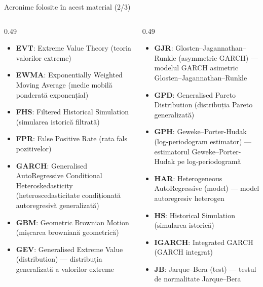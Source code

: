 \begin{frame}{Acronime folosite în acest material (2/3)}
\begin{columns}[T]
\begin{column}{0.49\textwidth}
\begin{itemize}\setlength{\itemsep}{0pt}
    \item \textbf{EVT}: Extreme Value Theory (teoria valorilor extreme)
    \item \textbf{EWMA}: Exponentially Weighted Moving Average (medie mobilă ponderată exponențial)
    \item \textbf{FHS}: Filtered Historical Simulation (simularea istorică filtrată)
    \item \textbf{FPR}: False Positive Rate (rata fals pozitivelor)
    \item \textbf{GARCH}: Generalised AutoRegressive Conditional Heteroskedasticity (heteroscedasticitate condiționată autoregresivă generalizată)
    \item \textbf{GBM}: Geometric Brownian Motion (mișcarea browniană geometrică)
    \item \textbf{GEV}: Generalised Extreme Value (distribution) — distribuția generalizată a valorilor extreme
\end{itemize}
\end{column}
\begin{column}{0.49\textwidth}
\begin{itemize}\setlength{\itemsep}{0pt}
    \item \textbf{GJR}: Glosten–Jagannathan–Runkle (asymmetric GARCH) — modelul GARCH asimetric Glosten–Jagannathan–Runkle
    \item \textbf{GPD}: Generalised Pareto Distribution (distribuția Pareto generalizată)
    \item \textbf{GPH}: Geweke–Porter-Hudak (log-periodogram estimator) — estimatorul Geweke–Porter-Hudak pe log-periodogramă
    \item \textbf{HAR}: Heterogeneous AutoRegressive (model) — model autoregresiv heterogen
    \item \textbf{HS}: Historical Simulation (simularea istorică)
    \item \textbf{IGARCH}: Integrated GARCH (GARCH integrat)
    \item \textbf{JB}: Jarque–Bera (test) — testul de normalitate Jarque–Bera
\end{itemize}
\end{column}
\end{columns}
\end{frame}

